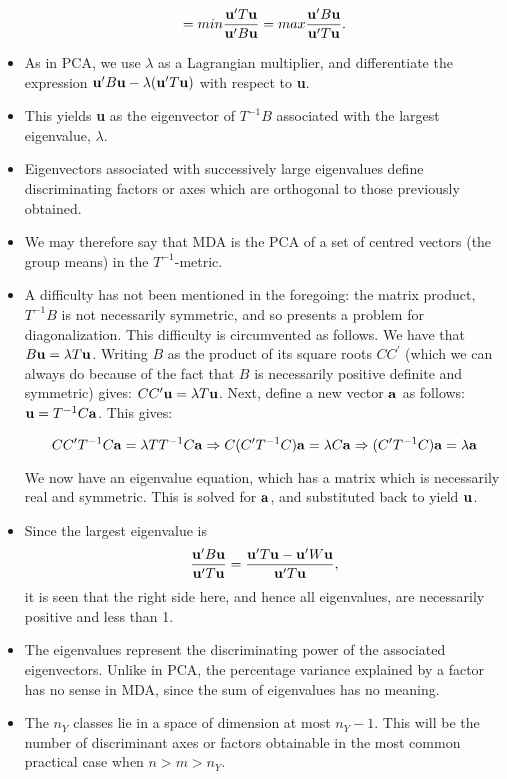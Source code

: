 \documentclass[a4,dvips]{seminar}
\begin{document}
\begin{slide}
\begin{itemize}
$$ = {\sl min} {{{\bf u}^\prime T {\bf u}} \over {{\bf u}^\prime B {\bf u}}} 
 = {\sl max} {{{\bf u}^\prime B {\bf u}} \over {{\bf u}^\prime T {\bf u}}}. $$
\item As in PCA, we use $\lambda$ as a Lagrangian 
multiplier, and differentiate the
expression ${\bf u}^\prime B {\bf u} - \lambda({\bf u}^\prime T {\bf u})$ with
respect to {\bf u}. 
\item This yields {\bf u} as the eigenvector of $T^{-1}B$ 
associated with the largest eigenvalue, $\lambda$.  
\item Eigenvectors associated 
with successively large eigenvalues define discriminating factors or axes 
which are orthogonal to those previously obtained.  
\item  We may therefore say 
that MDA is the PCA of a set of centred vectors (the group means) in the
$T^{-1}$-metric.
\item A difficulty has not been mentioned in the foregoing: the matrix product,
$T^{-1}B$ is not necessarily symmetric, and so presents a problem for
diagonalization.  This difficulty is circumvented as follows. We have that
$B{\bf u} = \lambda T {\bf u}$.  Writing $B$ as the product of its square
roots $CC^\prime$
(which we can always do because of the fact that $B$ is necessarily
positive definite and symmetric) gives:  $CC^\prime {\bf u} = \lambda T 
{\bf u}$.
Next, define a new vector ${\bf a}$ as follows: ${\bf u} = T^{-1}C{\bf a}$.
This gives:

$$ CC^\prime T^{-1} C {\bf a} = \lambda T T^{-1} C {\bf a} 
\Rightarrow C(C^\prime T^{-1} C){\bf a} = \lambda C {\bf a}
\Rightarrow (C^\prime T^{-1} C){\bf a} = \lambda {\bf a} $$

We now have an eigenvalue equation, which has a matrix which is necessarily
real and symmetric. This is solved for ${\bf a}$, and substituted back to
yield ${\bf u}$.
\item Since the largest eigenvalue is 
$${{{\bf u}^\prime B {\bf u}} \over {{\bf u}^\prime T {\bf u}}}
 = {{{\bf u}^\prime T {\bf u} - {\bf u}^\prime W {\bf u}} 
                        \over {{\bf u}^\prime T {\bf u}}}, $$ it
is seen that the right side here, and hence all eigenvalues, are
necessarily positive and less than 1.
\item The eigenvalues represent the discriminating power of the associated
eigenvectors.  Unlike in PCA, the percentage variance explained by a
factor has no sense in MDA, since the sum of eigenvalues has no
meaning.
\item The $n_Y$ classes lie in a space of dimension at most $n_Y - 1$.
This will be the number of discriminant axes or factors obtainable
in the most common practical case when $ n > m > n_Y $.
\end{itemize}
\end{slide}
\end{document}

